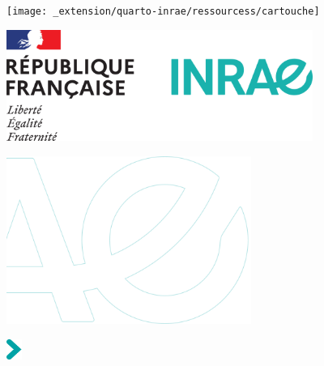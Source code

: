 \makeatletter
\let\inserttitle\@title
\makeatother
\makeatletter
\let\insertauthor\@author
\makeatother
\makeatletter
\let\insertdate\@date
\makeatother


\vspace*{-4.5cm}

%

\vspace*{12.15cm}

\hspace{-2.7cm}
\texttt{[image: \_extension/quarto-inrae/ressourcess/cartouche]}\par

\hspace{12cm}
\includegraphics[width=10cm]{_extensions/quarto-inrae/ressources/bloc-etat}\par

\vspace*{-2cm}

\hspace{-2.8cm}
\includegraphics[width=8cm]{_extensions/quarto-inrae/ressources/sigle-inrae}

\vspace*{1cm}

\hspace{-1cm}
\setlength{\parindent}{0cm}
\includegraphics[width=0.5cm]{_extensions/quarto-inrae/ressources/fleche-titre}\hspace{0.3cm}\textcolor{inrae}{\sffamily\Huge\bfseries \inserttitle}\par\bigskip

